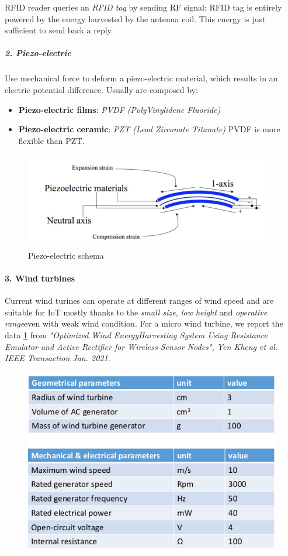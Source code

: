 \documentclass[10pt,a4paper]{report}
\theoremstyle{definition}
\begin{document}
RFID reader queries an \textit{RFID tag} by sending RF signal: RFID tag is entirely powered by the energy harvested by the antenna
coil. This energy is just sufficient to send back a reply.
\subparagraph{2. Piezo-electric}\label{sec:2-piezo-electric}
Use mechanical force to deform a piezo-electric material,
which results in an electric potential difference. Usually are composed by:
\begin{itemize}
	\item 
	\textbf{Piezo-electric films}: \textit{PVDF (PolyVinylidene Fluoride)}
	\item 
	\textbf{Piezo-electric ceramic}: \textit{PZT (Lead Zirconate Titanate)}
	PVDF is more flexible than PZT.

	
\end{itemize}
	\begin{figure}[h]
	\centering\includegraphics[scale=0.50]{images/Pasted image 20230506081428.png}
	\caption{Piezo-electric schema}
\end{figure}
\paragraph{3. Wind turbines}\label{sec:3-wind-turbines}
Current wind turines can operate at different ranges of wind speed and are suitable for IoT mostly thanks to the \textit{small size, low height} and \textit{operative range}even with weak wind condition.
For a micro wind turbine, we report the data \ref{wind-turbine-value} from \textit{"Optimized Wind EnergyHarvesting System Using Resistance Emulator and Active Rectifier for Wireless Sensor Nodes", Yen Kheng et al. IEEE Transaction Jan. 2021}.

\begin{figure}[h]
	\centering\includegraphics[scale=0.45]{images/Pasted image 20230506081753.png}
\label{wind-turbine-value}
\end{figure}
\end{document}
